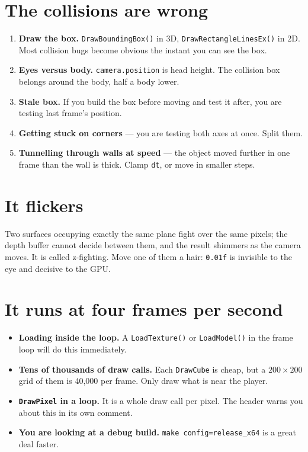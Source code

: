 \section{The collisions are wrong}

\begin{enumerate}[leftmargin=*,itemsep=3pt]
  \item \textbf{Draw the box.} \lstinline|DrawBoundingBox()| in 3D,
        \lstinline|DrawRectangleLinesEx()| in 2D. Most collision bugs become
        obvious the instant you can see the box.
  \item \textbf{Eyes versus body.} \lstinline|camera.position| is head height.
        The collision box belongs around the body, half a body lower.
  \item \textbf{Stale box.} If you build the box before moving and test it after,
        you are testing last frame's position.
  \item \textbf{Getting stuck on corners} --- you are testing both axes at once.
        Split them.
  \item \textbf{Tunnelling through walls at speed} --- the object moved further
        in one frame than the wall is thick. Clamp \lstinline|dt|, or move in
        smaller steps.
\end{enumerate}

\section{It flickers}

Two surfaces occupying exactly the same plane fight over the same pixels; the
depth buffer cannot decide between them, and the result shimmers as the camera
moves. It is called z-fighting. Move one of them a hair: \lstinline|0.01f| is
invisible to the eye and decisive to the GPU.

\section{It runs at four frames per second}

\begin{itemize}[leftmargin=*,itemsep=3pt]
  \item \textbf{Loading inside the loop.} A \lstinline|LoadTexture()| or
        \lstinline|LoadModel()| in the frame loop will do this immediately.
  \item \textbf{Tens of thousands of draw calls.} Each
        \lstinline|DrawCube| is cheap, but a $200\times200$ grid of them is
        40,000 per frame. Only draw what is near the player.
  \item \textbf{\lstinline|DrawPixel| in a loop.} It is a whole draw call per
        pixel. The header warns you about this in its own comment.
  \item \textbf{You are looking at a debug build.} \lstinline|make config=release_x64|
        is a great deal faster.
\end{itemize}

